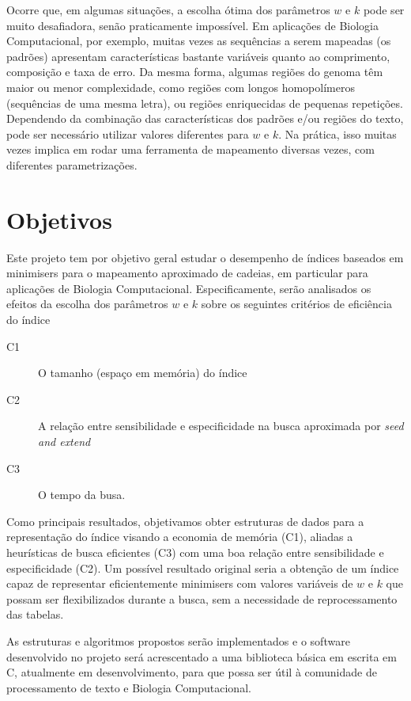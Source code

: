 \documentclass[12pt, a4paper, oneside]{article}
\begin{document}
Ocorre que, em algumas situações, a escolha ótima dos parâmetros $w$ e $k$ pode ser muito desafiadora, senão praticamente impossível. Em aplicações de Biologia Computacional, por exemplo, muitas vezes as sequências a serem mapeadas (os padrões) apresentam características bastante variáveis quanto ao comprimento, composição e taxa de erro. Da mesma forma, algumas regiões do genoma têm maior ou menor complexidade, como regiões com longos homopolímeros (sequências de uma mesma letra), ou  regiões enriquecidas de pequenas repetições. Dependendo da combinação das características dos padrões e/ou regiões do texto, pode ser necessário utilizar valores diferentes para $w$ e $k$. Na prática, isso muitas vezes implica em rodar uma ferramenta de mapeamento diversas vezes, com diferentes parametrizações.



\clearpage
\section{Objetivos}

Este projeto tem por objetivo geral estudar o desempenho de índices baseados em minimisers para o mapeamento aproximado de cadeias, em particular para aplicações de Biologia Computacional. Especificamente, serão analisados  os efeitos da escolha dos parâmetros $w$ e $k$ sobre os seguintes critérios de eficiência do índice
\begin{description}
\item[C1] O tamanho (espaço em memória) do índice
\item[C2] A relação entre sensibilidade e especificidade na busca aproximada por \emph{seed and extend}
\item[C3] O tempo da busa.
\end{description}
Como principais resultados, objetivamos obter estruturas de dados para a representação do índice visando a economia de memória (C1), aliadas a heurísticas de busca eficientes (C3) com uma boa relação entre sensibilidade e especificidade (C2). Um possível resultado original seria a obtenção de um índice capaz de representar eficientemente minimisers com valores variáveis de $w$ e $k$ que possam ser flexibilizados durante a busca, sem a necessidade de reprocessamento das tabelas.

As estruturas e algoritmos propostos serão implementados e o  software desenvolvido no projeto será acrescentado a uma biblioteca básica em escrita em C, atualmente em desenvolvimento, para que possa ser útil à comunidade de processamento de texto e Biologia Computacional.
\end{document}
